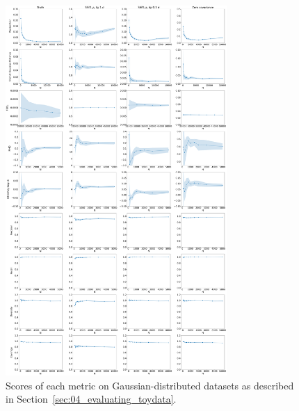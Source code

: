 \begin{figure}[htpb]
    \centering
    \includegraphics[width=0.75\textwidth]{figures/04-ML4Sim/evaluating/toy_scores_1.pdf}
    \caption{Scores of each metric on Gaussian-distributed datasets as described in Section~\ref{sec:04_evaluating_toydata}.}
    \label{fig:04_evaluating_toyscores1}
\end{figure}

